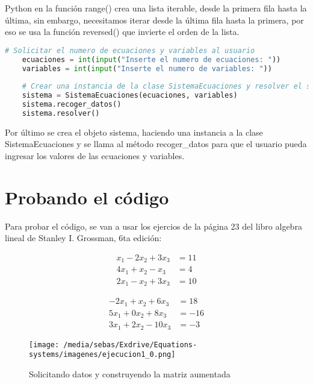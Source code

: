 \documentclass[letterpaper,12pt]{article}
\begin{document}
Python en la función range() crea una lista iterable, desde la primera fila hasta la última, sin embargo, necesitamos iterar desde la última fila hasta la primera, por eso se usa la función reversed() que invierte el orden de la lista.
\\\begin{lstlisting}[style=jupyter, language=Python, caption={Método para resolver el sistema de ecuaciones}]
    # Solicitar el numero de ecuaciones y variables al usuario
    ecuaciones = int(input("Inserte el numero de ecuaciones: "))
    variables = int(input("Inserte el numero de variables: "))
    
    # Crear una instancia de la clase SistemaEcuaciones y resolver el sistema
    sistema = SistemaEcuaciones(ecuaciones, variables)
    sistema.recoger_datos()
    sistema.resolver()
\end{lstlisting}

Por último se crea el objeto sistema, haciendo una instancia a la clase \textcolor{jl_keyword}{SistemaEcuaciones} y se llama al método \textcolor{jl_keyword}{recoger\_datos} para que el usuario pueda ingresar los valores de las ecuaciones y variables.

\section*{Probando el código}
Para probar el código, se van a usar los ejercios de la página 23 del libro algebra lineal de Stanley I. Grossman, 6ta edición:
\\
\begin{minipage}{0.5\textwidth}
    \begin{align*}
        x_1 - 2x_2 + 3x_3 &= 11 \\
        4x_1 + x_2 - x_3 &= 4 \\
        2x_1 - x_2 + 3x_3 &= 10
    \end{align*}
    \end{minipage}
    \begin{minipage}{0.5\textwidth}
    \begin{align*}
        -2x_1 + x_2 + 6x_3 &= 18 \\
        5x_1 + 0x_2 + 8x_3 &= -16 \\
        3x_1 + 2x_2 - 10x_3 &= -3
    \end{align*}
    \end{minipage}

\begin{figure}[htbp]
    \centering
    \texttt{[image: /media/sebas/Exdrive/Equations-systems/imagenes/ejecucion1\_0.png]}
    \caption{Solicitando datos y construyendo la matriz aumentada}
    \label{fig: Matriz aumentada ejemplo 1}
\end{figure}
\end{document}
